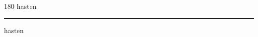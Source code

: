 
\begin{frame}
\begin{center}
\begin{turn}{180}
{\fontsize{2.5cm}{1em}\selectfont hasten}
\end{turn}
\vspace{1em}\par  
\hrule
\vspace{1em}\par  
{\fontsize{2.5cm}{1em}\selectfont hasten}
\end{center}
\end{frame}
